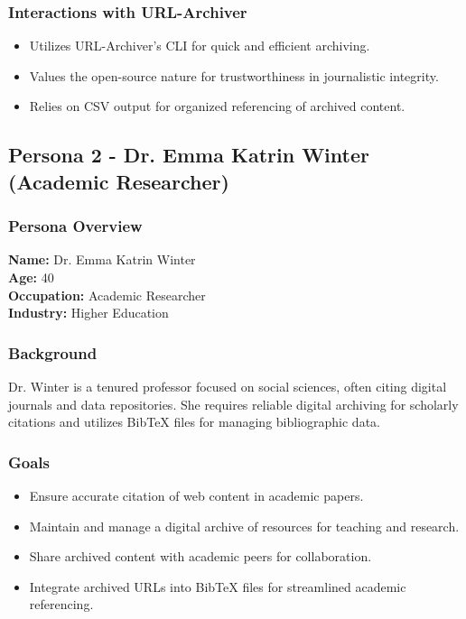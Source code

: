 \subsubsection{Interactions with URL-Archiver}
\begin{itemize}
    \item Utilizes URL-Archiver's CLI for quick and efficient archiving.
    \item Values the open-source nature for trustworthiness in journalistic integrity.
    \item Relies on CSV output for organized referencing of archived content.
\end{itemize}

\subsection{Persona 2 - Dr. Emma Katrin Winter (Academic Researcher)}

\subsubsection{Persona Overview}

\textbf{Name:} Dr. Emma Katrin Winter \\
\textbf{Age:} 40 \\
\textbf{Occupation:} Academic Researcher \\
\textbf{Industry:} Higher Education

\subsubsection{Background}
Dr. Winter is a tenured professor focused on social sciences, often citing digital journals and data repositories.
She requires reliable digital archiving for scholarly citations and utilizes BibTeX files for managing bibliographic data.

\subsubsection{Goals}
\begin{itemize}
    \item Ensure accurate citation of web content in academic papers.
    \item Maintain and manage a digital archive of resources for teaching and research.
    \item Share archived content with academic peers for collaboration.
    \item Integrate archived URLs into BibTeX files for streamlined academic referencing.
\end{itemize}

